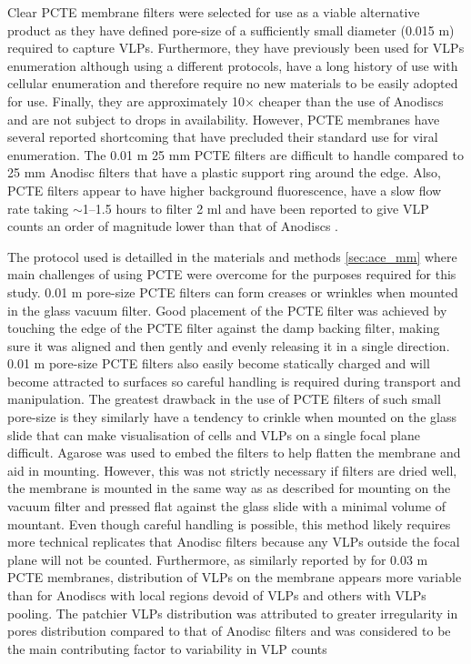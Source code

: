 Clear \ac{PCTE} membrane filters were selected for use as a viable alternative product as they have defined pore-size of a sufficiently small diameter (0.015 \textmu{}m) required to capture \acp{VLP}. 
Furthermore, they have previously been used for \acp{VLP} enumeration \cite{Hara1991, Proctor1992} although using a different protocols, have a long history of use with cellular enumeration \cite{Hobbie1977} and therefore require no new materials to be easily adopted for use.
Finally, they are approximately 10$\times$ cheaper than the use of Anodiscs and are not subject to drops in availability.
However, \ac{PCTE} membranes have several reported shortcoming that have precluded their standard use for viral enumeration.
The 0.01 \textmu{}m 25 mm \ac{PCTE} filters are difficult to handle compared to 25 mm Anodisc filters that have a plastic support ring around the edge.
Also, \ac{PCTE} filters appear to have higher background fluorescence, have a slow flow rate taking $\sim$1--1.5 hours to filter 2 ml \cite{Hara1991} and have been reported to give \ac{VLP} counts an order of magnitude lower than that of Anodiscs \cite{Budinoff2011}.%

The protocol used is detailled in the materials and methods \ref{sec:ace_mm} where main challenges of using \ac{PCTE} were overcome for the purposes required for this study.
0.01 \textmu{}m pore-size \ac{PCTE} filters can form creases or wrinkles when mounted in the glass vacuum filter.
Good placement of the \ac{PCTE} filter was achieved by touching the edge of the \ac{PCTE} filter against the damp backing filter, making sure it was aligned and then gently and evenly releasing it in a single direction. 
0.01 \textmu{}m pore-size \ac{PCTE} filters also easily become statically charged and will become attracted to surfaces so careful handling is required during transport and manipulation. 
The greatest drawback in the use of \ac{PCTE} filters of such small pore-size is they similarly have a tendency to crinkle when mounted on the glass slide that can make visualisation of cells and \acp{VLP} on a single focal plane difficult.
Agarose was used to embed the filters to help flatten the membrane and aid in mounting.
However, this was not strictly necessary if filters are dried well, the membrane is mounted in the same way as as described for mounting on the vacuum filter and pressed flat against the glass slide with a minimal volume of mountant.
Even though careful handling is possible, this method likely requires more technical replicates that Anodisc filters because any \acp{VLP} outside the focal plane will not be counted.
Furthermore, as similarly reported by \citet{Diemer2012} for 0.03 \textmu{}m \ac{PCTE} membranes, distribution of \acp{VLP} on the membrane appears more variable than for Anodiscs with local regions devoid of \acp{VLP} and others with \acp{VLP} pooling.
The patchier \acp{VLP} distribution was attributed to greater irregularity in pores distribution compared to that of Anodisc filters and was considered to be the main contributing factor to variability in \ac{VLP} counts \cite{Diemer2012}

